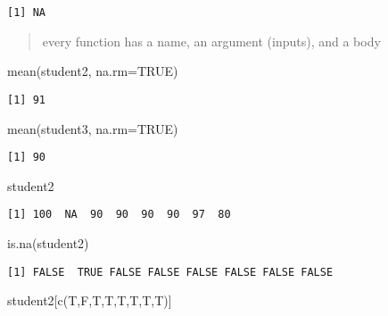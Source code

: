 \documentclass[
  letterpaper,
  DIV=11,
  numbers=noendperiod]{scrartcl}
\newenvironment{Shaded}{\begin{snugshade}}{\end{snugshade}}
\newcommand{\AttributeTok}[1]{\textcolor[rgb]{0.40,0.45,0.13}{#1}}
\newcommand{\ConstantTok}[1]{\textcolor[rgb]{0.56,0.35,0.01}{#1}}
\newcommand{\FunctionTok}[1]{\textcolor[rgb]{0.28,0.35,0.67}{#1}}
\newcommand{\NormalTok}[1]{\textcolor[rgb]{0.00,0.23,0.31}{#1}}
\begin{document}
\begin{verbatim}
[1] NA
\end{verbatim}

\begin{quote}
every function has a name, an argument (inputs), and a body
\end{quote}

\begin{Shaded}
\begin{Highlighting}[]
\FunctionTok{mean}\NormalTok{(student2, }\AttributeTok{na.rm=}\ConstantTok{TRUE}\NormalTok{)}
\end{Highlighting}
\end{Shaded}

\begin{verbatim}
[1] 91
\end{verbatim}

\begin{Shaded}
\begin{Highlighting}[]
\FunctionTok{mean}\NormalTok{(student3, }\AttributeTok{na.rm=}\ConstantTok{TRUE}\NormalTok{)}
\end{Highlighting}
\end{Shaded}

\begin{verbatim}
[1] 90
\end{verbatim}

\begin{Shaded}
\begin{Highlighting}[]
\NormalTok{student2}
\end{Highlighting}
\end{Shaded}

\begin{verbatim}
[1] 100  NA  90  90  90  90  97  80
\end{verbatim}

\begin{Shaded}
\begin{Highlighting}[]
\FunctionTok{is.na}\NormalTok{(student2)}
\end{Highlighting}
\end{Shaded}

\begin{verbatim}
[1] FALSE  TRUE FALSE FALSE FALSE FALSE FALSE FALSE
\end{verbatim}

\begin{Shaded}
\begin{Highlighting}[]
\NormalTok{student2[}\FunctionTok{c}\NormalTok{(T,F,T,T,T,T,T,T)]}
\end{Highlighting}
\end{Shaded}
\end{document}
